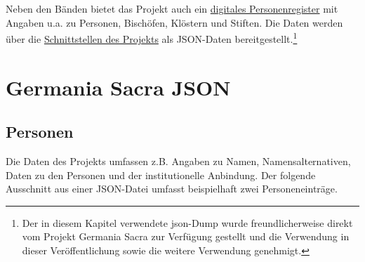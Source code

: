 \documentclass[ngerman,]{scrreprt}
\begin{document}
Neben den Bänden bietet das Projekt auch ein \href{https://adw-goe.de/forschung/forschungsprojekte-akademienprogramm/germania-sacra/digitales-personenregister/}{digitales Personenregister} mit Angaben u.a. zu Personen, Bischöfen, Klöstern und Stiften. Die Daten werden über die \href{https://adw-goe.de/forschung/forschungsprojekte-akademienprogramm/germania-sacra/schnittstellen-und-linked-data/}{Schnittstellen des Projekts} als JSON-Daten bereitgestellt.\footnote{Der in diesem Kapitel verwendete json-Dump wurde freundlicherweise direkt vom Projekt Germania Sacra zur Verfügung gestellt und die Verwendung in dieser Veröffentlichung sowie die weitere Verwendung genehmigt.}

\section{Germania Sacra JSON}\label{germania-sacra-json}

\subsection{Personen}\label{personen}

Die Daten des Projekts umfassen z.B. Angaben zu Namen, Namensalternativen, Daten zu den Personen und der institutionelle Anbindung. Der folgende Ausschnitt aus einer JSON-Datei umfasst beispielhaft zwei Personeneinträge.
\end{document}
